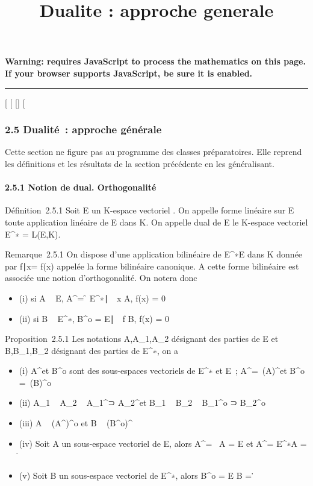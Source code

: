 \documentclass[]{article}
\title{Dualite : approche generale}
\author{}
\date{}
\begin{document}
\maketitle

\textbf{Warning: 
requires JavaScript to process the mathematics on this page.\\ If your
browser supports JavaScript, be sure it is enabled.}

\begin{center}\rule{3in}{0.4pt}\end{center}

[
[
[]
[

\subsubsection{2.5 Dualité~: approche générale}

Cette section ne figure pas au programme des classes préparatoires. Elle
reprend les définitions et les résultats de la section précédente en les
généralisant.

\paragraph{2.5.1 Notion de dual. Orthogonalité}

Définition~2.5.1 Soit E un K-espace vectoriel . On appelle forme
linéaire sur E toute application linéaire de E dans K. On appelle dual
de E le K-espace vectoriel E^∗ = L(E,K).

Remarque~2.5.1 On dispose d'une application bilinéaire de
E^∗\times E dans K donnée par \langle
f∣x\rangle = f(x) appelée la
forme bilinéaire canonique. A cette forme bilinéaire est associée une
notion d'orthogonalité. On notera donc

\begin{itemize}
\itemsep1pt\parskip0pt
\item
  (i) si A \subset~ E, A^\bot = \f \in
  E^∗∣\forall~~x
  \in A, f(x) = 0\
\item
  (ii) si B \subset~ E^∗, B^o = \x \in
  E∣\forall~~f \in B, f(x) =
  0\
\end{itemize}

Proposition~2.5.1 Les notations A,A_1,A_2 désignant
des parties de E et B,B_1,B_2 désignant des parties de
E^∗, on a

\begin{itemize}
\itemsep1pt\parskip0pt
\item
  (i) A^\bot et B^o sont des sous-espaces vectoriels
  de E^∗ et E~; A^\bot =\
  \mathrmVect(A)^\bot et B^o
  =\
  \mathrmVect(B)^o
\item
  (ii) A_1 \subset~ A_2 \rigtharrow~ A_1^\bot⊃
  A_2^\bot et B_1 \subset~ B_2 \rigtharrow~
  B_1^o ⊃ B_2^o
\item
  (iii) A \subset~ (A^\bot)^o et B \subset~
  (B^o)^\bot
\item
  (iv) Soit A un sous-espace vectoriel de E, alors A^\bot =
  \0\ \Leftrightarrow A =
  E et A^\bot = E^∗\Leftrightarrow A =
  \0\.
\item
  (v) Soit B un sous-espace vectoriel de E^∗, alors
  B^o = E \Leftrightarrow B =
  \0\.
\end{itemize}
\end{document}
